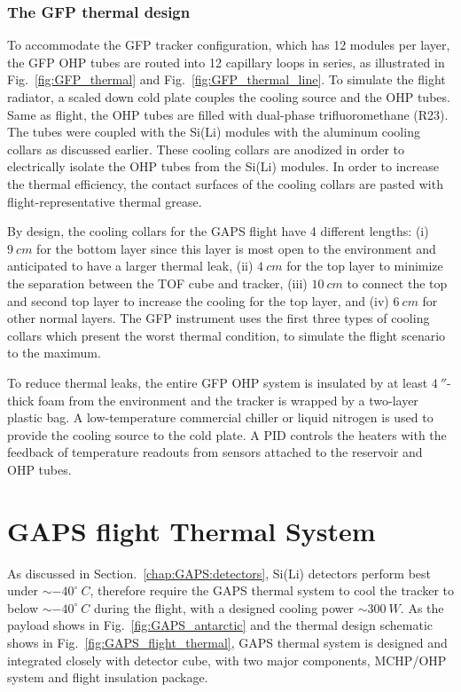 \subsubsection*{The \ac{GFP} thermal design}
To accommodate the \ac{GFP} tracker configuration, which has 12 modules per layer, the \ac{GFP} OHP tubes are routed into 12 capillary loops in series, as illustrated in Fig.~\ref{fig:GFP_thermal} and Fig.~\ref{fig:GFP_thermal_line}. To simulate the flight radiator, a scaled down cold plate couples the cooling source and the OHP tubes. Same as flight, the OHP tubes are filled with dual-phase trifluoromethane (R23). The tubes were coupled with the \ac{Si(Li)} modules with the aluminum cooling collars as discussed earlier. These cooling collars are anodized in order to electrically isolate the OHP tubes from the \ac{Si(Li)} modules. In order to increase the thermal efficiency, the contact surfaces of the cooling collars are pasted with flight-representative thermal grease.

By design, the cooling collars for the \ac{GAPS} flight have 4 different lengths: (i) $ 9~cm $ for the bottom layer since this layer is most open to the environment and anticipated to have a larger thermal leak, (ii) $ 4~cm $ for the top layer to minimize the separation between the \ac{TOF} cube and tracker, (iii) $ 10~cm $ to connect the top and second top layer to increase the cooling for the top layer, and (iv) $ 6~cm $ for other normal layers. The \ac{GFP} instrument uses the first three types of cooling collars which present the worst thermal condition, to simulate the flight scenario to the maximum.

To reduce thermal leaks, the entire \ac{GFP} OHP system is insulated by at least $ 4~'' $-thick foam from the environment and the tracker is wrapped by a two-layer plastic bag. A low-temperature commercial chiller or liquid nitrogen is used to provide the cooling source to the cold plate. A PID controls the heaters with the feedback of temperature readouts from sensors attached to the reservoir and OHP tubes.

\section{GAPS flight Thermal System}
\label{chap:GAPS:thermal}

As discussed in Section.~\ref{chap:GAPS:detectors}, \ac{Si(Li)} detectors perform best under $\sim-40^\circ~C$, therefore require the \ac{GAPS} thermal system to cool the tracker to below $ \sim-40^\circ~C $ during the flight, with a designed cooling power $ \sim300~W $. As the payload shows in Fig.~\ref{fig:GAPS_antarctic} and the thermal design schematic shows in Fig.~\ref{fig:GAPS_flight_thermal}, \ac{GAPS} thermal system is designed and integrated closely with detector cube, with two major components, \ac{MCHP}/\ac{OHP} system and flight insulation package.

